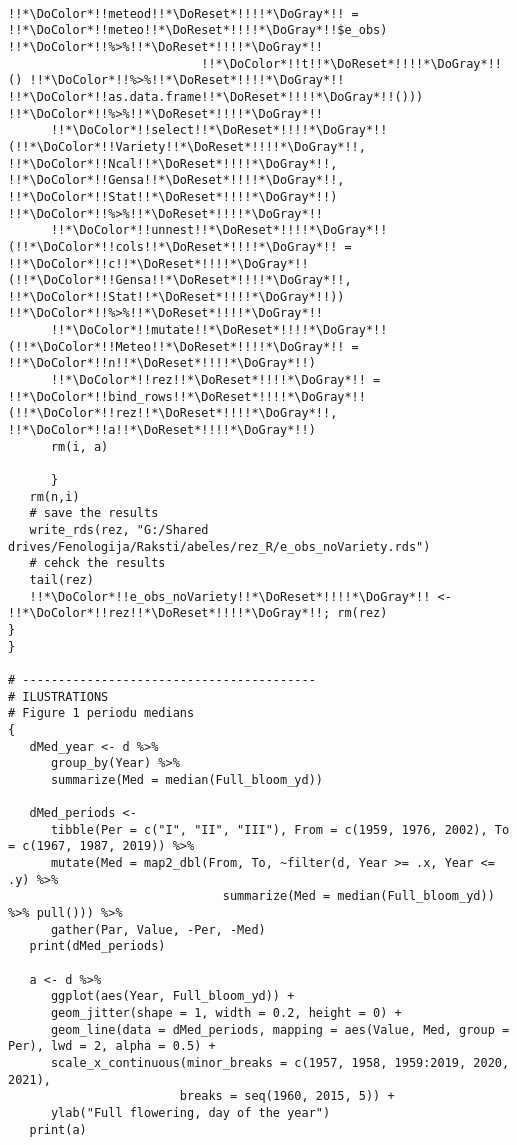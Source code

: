 \begin{verbatim}
                                                   !!*\DoColor*!!meteod!!*\DoReset*!!!!*\DoGray*!! = !!*\DoColor*!!meteo!!*\DoReset*!!!!*\DoGray*!!$e_obs)  !!*\DoColor*!!%>%!!*\DoReset*!!!!*\DoGray*!!
                           !!*\DoColor*!!t!!*\DoReset*!!!!*\DoGray*!!() !!*\DoColor*!!%>%!!*\DoReset*!!!!*\DoGray*!! !!*\DoColor*!!as.data.frame!!*\DoReset*!!!!*\DoGray*!!())) !!*\DoColor*!!%>%!!*\DoReset*!!!!*\DoGray*!!
      !!*\DoColor*!!select!!*\DoReset*!!!!*\DoGray*!!(!!*\DoColor*!!Variety!!*\DoReset*!!!!*\DoGray*!!, !!*\DoColor*!!Ncal!!*\DoReset*!!!!*\DoGray*!!, !!*\DoColor*!!Gensa!!*\DoReset*!!!!*\DoGray*!!, !!*\DoColor*!!Stat!!*\DoReset*!!!!*\DoGray*!!) !!*\DoColor*!!%>%!!*\DoReset*!!!!*\DoGray*!!
      !!*\DoColor*!!unnest!!*\DoReset*!!!!*\DoGray*!!(!!*\DoColor*!!cols!!*\DoReset*!!!!*\DoGray*!! = !!*\DoColor*!!c!!*\DoReset*!!!!*\DoGray*!!(!!*\DoColor*!!Gensa!!*\DoReset*!!!!*\DoGray*!!, !!*\DoColor*!!Stat!!*\DoReset*!!!!*\DoGray*!!)) !!*\DoColor*!!%>%!!*\DoReset*!!!!*\DoGray*!!
      !!*\DoColor*!!mutate!!*\DoReset*!!!!*\DoGray*!!(!!*\DoColor*!!Meteo!!*\DoReset*!!!!*\DoGray*!! = !!*\DoColor*!!n!!*\DoReset*!!!!*\DoGray*!!)
      !!*\DoColor*!!rez!!*\DoReset*!!!!*\DoGray*!! = !!*\DoColor*!!bind_rows!!*\DoReset*!!!!*\DoGray*!!(!!*\DoColor*!!rez!!*\DoReset*!!!!*\DoGray*!!, !!*\DoColor*!!a!!*\DoReset*!!!!*\DoGray*!!)
      rm(i, a)

      }
   rm(n,i)
   # save the results
   write_rds(rez, "G:/Shared drives/Fenologija/Raksti/abeles/rez_R/e_obs_noVariety.rds")
   # cehck the results
   tail(rez)
   !!*\DoColor*!!e_obs_noVariety!!*\DoReset*!!!!*\DoGray*!! <- !!*\DoColor*!!rez!!*\DoReset*!!!!*\DoGray*!!; rm(rez)
}
}

# -----------------------------------------
# ILUSTRATIONS
# Figure 1 periodu medians
{
   dMed_year <- d %>%
      group_by(Year) %>%
      summarize(Med = median(Full_bloom_yd))

   dMed_periods <-
      tibble(Per = c("I", "II", "III"), From = c(1959, 1976, 2002), To = c(1967, 1987, 2019)) %>%
      mutate(Med = map2_dbl(From, To, ~filter(d, Year >= .x, Year <= .y) %>%
                              summarize(Med = median(Full_bloom_yd)) %>% pull())) %>%
      gather(Par, Value, -Per, -Med)
   print(dMed_periods)

   a <- d %>%
      ggplot(aes(Year, Full_bloom_yd)) +
      geom_jitter(shape = 1, width = 0.2, height = 0) +
      geom_line(data = dMed_periods, mapping = aes(Value, Med, group = Per), lwd = 2, alpha = 0.5) +
      scale_x_continuous(minor_breaks = c(1957, 1958, 1959:2019, 2020, 2021),
                        breaks = seq(1960, 2015, 5)) +
      ylab("Full flowering, day of the year")
   print(a)


\end{verbatim}
